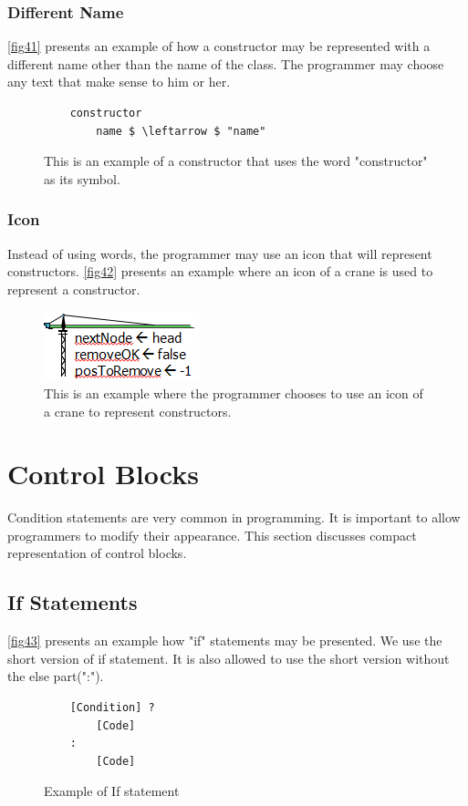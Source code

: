 \subsubsection{Different Name}
\autoref{fig41} presents an example of how a constructor may be represented with a different name other than the name of the class. The programmer may choose any text that make sense to him or her.
\begin{figure}[H]
	\begin{lstlisting}
	constructor
		name $ \leftarrow $ "name"
	\end{lstlisting}
	\caption{This is an example of a constructor that uses the word "constructor" as its symbol.}
	\label{fig41}
\end{figure}
\subsubsection{Icon}
Instead of using words, the programmer may use an icon that will represent constructors. \autoref{fig42} presents an example where an icon of a crane is used to represent a constructor.
\begin{figure}[H]
	\includegraphics{"./fig/Crane Constructor"}
	\caption{This is an example where the programmer chooses to use an icon of a crane to represent constructors.}
	\label{fig42}
\end{figure}
\section{Control Blocks}
Condition statements are very common in programming. It is important to allow programmers to modify their appearance. This section discusses compact representation of control blocks.
\subsection{If Statements}
\autoref{fig43} presents an example how "if" statements may be presented. We use the short version of if statement. It is also allowed to use the short version without the else part(":").
\begin{figure}[H]
	\begin{lstlisting}
	[Condition] ?
		[Code]
	:
		[Code]
	\end{lstlisting}
	\caption{Example of If statement}
	\label{fig43}
\end{figure}
